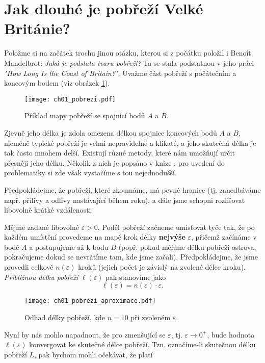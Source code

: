 \section{Jak dlouhé je pobřeží Velké Británie?}\label{sec:pobrezi_velke_britanie}
Položme si na začátek trochu jinou otázku, kterou si z počátku položil i Benoît Mandelbrot: \emph{Jaká je podstata tvaru pobřeží?} Ta se stala podstatnou v jeho práci \emph{"How Long Is the Coast of Britain?"}. Uvažme část pobřeží s počátečním a koncovým bodem (viz obrázek \ref{fig:pobrezi}).
\begin{figure}[h]
    \centering
    \texttt{[image: ch01\_pobrezi.pdf]}
    \caption{Příklad mapy pobřeží se spojnicí bodů $A$ a $B$.}
    \label{fig:pobrezi}
\end{figure}
Zjevně jeho délka je zdola omezena délkou spojnice koncových bodů $A$ a $B$, nicméně typické pobřeží je velmi nepravidelné a klikaté, a jeho skutečná délka je tak často mnohem delší. Existují různé metody, které nám umožňují určit přesněji jeho délku. Několik z nich je popsáno v knize \citep[str. 79]{Mandelbrot1983}, pro uvedení do problematiky si zde však vystačíme s tou nejednodušší.\par
Předpokládejme, že pobřeží, které zkoumáme, má pevné hranice (tj. zanedbáváme např. přílivy a odlivy nastávající během roku), a dále jsme schopni rozlišovat libovolně krátké vzdálenosti.\par
Mějme zadané libovolné $\varepsilon>0$. Podél pobřeží začneme umisťovat tyče tak, že po každém umístění provedeme na mapě krok délky \textbf{nejvýše} $\varepsilon$, přičemž začínáme v bodě $A$ a postupujeme až k bodu $B$ (popř. pokud měříme délku pobřeží ostrova, pokračujeme dokud se nevrátíme tam, kde jsme začali). Předpokládejme, že jsme provedli celkově $n(\varepsilon)$ kroků (jejich počet je závislý na zvolené délce kroku). \emph{Přibližnou délku pobřeží} $\ell(\varepsilon)$ pak stanovíme jako
\begin{equation*}
    \ell(\varepsilon)=n(\varepsilon)\cdot\varepsilon.
\end{equation*}
\begin{figure}[h]
    \centering
    \texttt{[image: ch01\_pobrezi\_aproximace.pdf]}
    \caption{Odhad délky pobřeží, kde $n=10$ při zvoleném $\varepsilon$.}
    \label{fig:pobrezi_aproximace}
\end{figure}
Nyní by nás mohlo napadnout, že pro zmenšující se $\varepsilon$, tj. $\varepsilon\to0^+$, bude hodnota $\ell(\varepsilon)$ konvergovat ke skutečné délce pobřeží. Tzn. označíme-li skutečnou délku pobřeží $L$, pak bychom mohli očekávat, že platí
